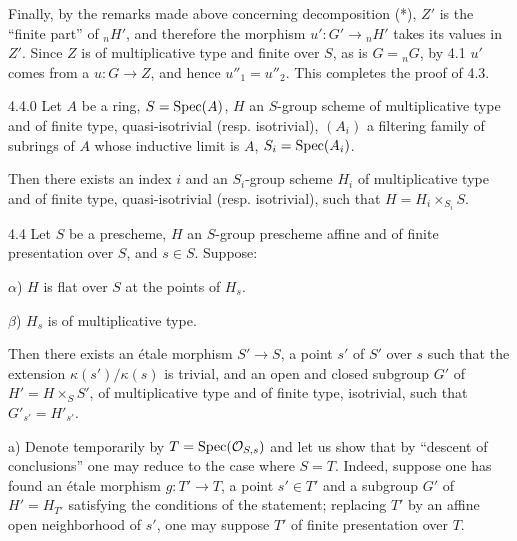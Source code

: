 Finally, by the remarks made above concerning decomposition (*), $Z'$ is the ``finite part'' of ${}_nH'$, and therefore the morphism $u':G'\to{}_nH'$ takes its values in $Z'$. Since $Z$ is of multiplicative type and finite over $S$, as is $G={}_nG$, by 4.1 $u'$ comes from a $u:G\to Z$, and hence $u''_1=u''_2$. This completes the proof of 4.3.
\begin{lemma}{4.4.0}\label{X.4.4.0}
 Let $A$ be a ring, $S=\operatorname{Spec}(A)$, $H$ an $S$-group scheme of multiplicative type and of finite type, quasi-isotrivial (resp. isotrivial), $(A_i)$ a filtering family of subrings of $A$ whose inductive limit is $A$, $S_i=\operatorname{Spec}(A_i)$.

Then there exists an index $i$ and an $S_i$-group scheme $H_i$ of multiplicative type and of finite type, quasi-isotrivial (resp. isotrivial), such that $H=H_i\times_{S_i}S$.
\end{lemma}
\begin{theorem}{4.4}\label{X.4.4}
Let $S$ be a prescheme, $H$ an $S$-group prescheme affine and of finite presentation over $S$, and $s\in S$. Suppose:

$\alpha$) $H$ is flat over $S$ at the points of $H_s$.

$\beta$) $H_s$ is of multiplicative type.

Then there exists an étale morphism $S'\to S$, a point $s'$ of $S'$ over $s$ such that the extension $\kappa(s')/\kappa(s)$ is trivial, and an open and closed subgroup $G'$ of $H'=H\times_S S'$, of multiplicative type and of finite type, isotrivial, such that $G'_{s'}=H'_{s'}$.
\end{theorem}
 a) Denote temporarily by $T=\operatorname{Spec}(\mathcal{O}_{S,s})$ and let us show that by ``descent of conclusions'' one may reduce to the case where $S=T$. Indeed, suppose one has found an étale morphism $g:T'\to T$, a point $s'\in T'$ and a subgroup $G'$ of $H'=H_{T'}$ satisfying the conditions of the statement; replacing $T'$ by an affine open neighborhood of $s'$, one may suppose $T'$ of finite presentation over $T$.

